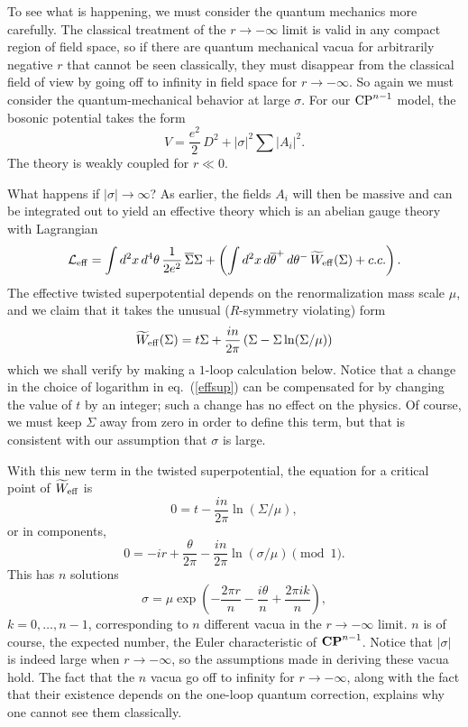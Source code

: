 To see what is happening, we must consider the quantum mechanics
more carefully.  The classical treatment of the  $r\to -\infty$ limit
is valid in any compact region of field space, so if there are quantum
mechanical vacua for arbitrarily negative $r$ that cannot be seen
classically, they must disappear from the classical field of view by
going off to infinity in field space for $r\to-\infty$.
So again we must consider the
quantum-mechanical behavior at large $\sigma$.  For our ${\rm CP}^{n-1}$
model, the bosonic potential takes the form
$$V=\frac{e^2}2\,D^2+|\sigma|^2\sum|A_i|^2.$$
The theory is weakly coupled for $r\ll0$.

What happens if $|\sigma|\to\infty$?  As earlier, the fields $A_i$ will then
be massive and can be integrated out to yield an effective theory which is
an abelian gauge theory with Lagrangian
$${\cal L}_{\rm eff}=
\int d^2x\,d^4\theta\,\frac1{2e^2}\,\overline{\Sigma}\Sigma
+\left(\int d^2x\,d\overline{\theta}^+\,d\theta^-\,\widetilde{W}_{\rm
eff}(\Sigma)
+ c.c. \right).$$
The effective twisted superpotential depends on the renormalization
mass scale $\mu$, and we claim that it takes the unusual ($R$-symmetry
violating) form
\begin{equation}\label{effsup}
\widetilde{W}_{\rm eff}(\Sigma)=t\Sigma +
\frac{in}{2\pi}\left(\Sigma-\Sigma\ln(\Sigma/\mu)\right)
\end{equation}
which we shall verify by making a $1$-loop calculation below.  Notice that
a change
in the choice of logarithm in eq.~(\ref{effsup}) can be compensated for by
changing the value of
$t$ by an integer; such a change has no effect on the physics.
Of course, we must keep $\Sigma$ away from zero in order to define this
term, but that is consistent with our assumption that $\sigma$ is large.



With this new term in the twisted superpotential, the equation for a
critical point of $\widetilde{W}_{\rm eff}$ is
$$0=t-\frac{in}{2\pi}\ln(\Sigma/\mu),$$
or in components,
$$0=-ir   + \frac\theta{2\pi}-\frac{in}{2\pi}\ln(\sigma/\mu)
\pmod1.$$
This has $n$ solutions
\begin{equation}\label{sigmavacua}
\sigma =\mu\exp\left(-\frac{2\pi r}n-\frac{i\theta}n+\frac{2\pi
ik}n\right),
\end{equation}
$k=0,\dots,n-1$,
corresponding to $n$ different vacua in the $r\to-\infty$ limit.  $n$ is
of course, the expected number, the Euler characteristic of ${\bf CP}^{n-1}$.
Notice that $|\sigma|$ is indeed large when $r\to-\infty$, so the
assumptions made in deriving these vacua hold.
The fact that the $n$ vacua go off to infinity for $r\to-\infty$,
along with the fact that their existence depends on the one-loop quantum
correction, explains why one cannot see them classically.

